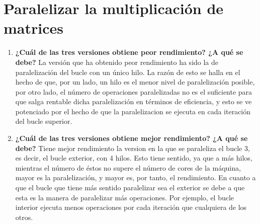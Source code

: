 \documentclass{report}
\newcommand\tab[1][0.6cm]{\hspace*{#1}}
\newcommand\nl{\newline\tab}
\begin{document}
	\section {Paralelizar la multiplicación de matrices}
	\begin{enumerate}
		\item{\textbf{\tab ¿Cuál	de	las	tres	versiones	obtiene	peor	rendimiento?	¿A	qué	se	debe?}\nl
			La versión que ha obtenido peor rendimiento ha sido la de paralelización del bucle  con un único hilo. La razón de esto se halla en el hecho de que, por un lado, un hilo es el menor nivel de paralelización posible, por otro lado, el número de operaciones paralelizadas no es el suficiente para que salga rentable dicha paralelización en términos de eficiencia, y esto se ve potenciado por el hecho de que la paralelizacion se ejecuta en cada iteración del bucle superior.}
		
		\item{\textbf{\tab ¿Cuál	de	las	tres	versiones	obtiene	mejor	rendimiento?	¿A	qué	se	debe?}\nl
			Tiene mejor rendimiento la version en la que se paraleliza el bucle 3, es decir, el bucle exterior, con 4 hilos. Esto tiene sentido, ya que a más hilos, mientras el número de éstos no supere el número de cores de la máquina, mayor es la paralelización, y mayor es, por tanto, el rendimiento. En cuanto a que el bucle que tiene más sentido paralelizar sea el exterior se debe a que esta es la manera de paralelizar más operaciones. Por ejemplo, el bucle interior ejecuta menos operaciones por cada iteración que cualquiera de los otros.}
		
	\end{enumerate}
	\newpage
\end{document}
